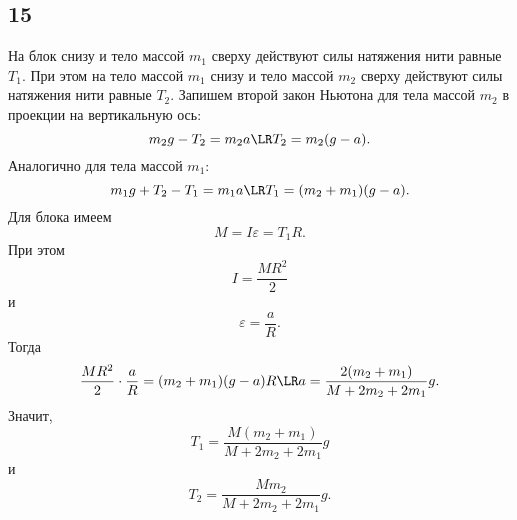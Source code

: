 \subsection{15}

На блок снизу и тело массой $m_1$ сверху действуют силы натяжения нити равные $T_1$. При этом на тело массой $m_1$ снизу и тело массой $m_2$ сверху действуют силы натяжения нити равные $T_2$. Запишем второй закон Ньютона для тела массой $m_2$ в проекции на вертикальную ось:
\[
m_2g-T_2=m_2a\LR T_2=m_2(g-a).
\]
Аналогично для тела массой $m_1$:
\[
m_1g+T_2-T_1=m_1a\LR T_1=(m_2+m_1)(g-a).
\]
Для блока имеем
\[
M=I\varepsilon=T_1R.
\]
При этом
\[
I=\frac{MR^2}{2}
\]
и
\[
\varepsilon=\frac{a}{R}.
\]
Тогда
\[
\frac{MR^2}{2}\cdot\frac{a}{R}=(m_2+m_1)(g-a)R\LR a=\frac{2(m_2+m_1)}{M+2m_2+2m_1}g.
\]
Значит,
\[
T_1=\frac{M(m_2+m_1)}{M+2m_2+2m_1}g
\]
и
\[
T_2=\frac{Mm_2}{M+2m_2+2m_1}g.
\]